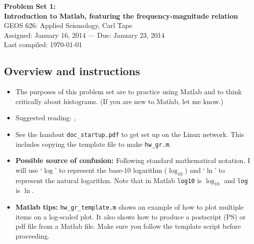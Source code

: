 \documentclass[11pt,titlepage,fleqn]{article}
\begin{document}

\begin{spacing}{1.2}
\begin{center}
{\large \bf Problem Set 1: \\
Introduction to Matlab, featuring the frequency-magnitude relation} \\
GEOS 626: Applied Seismology, Carl Tape \\
Assigned: January 16, 2014 --- Due: January 23, 2014 \\
Last compiled: \today
\end{center}
\end{spacing}


\subsection*{Overview and instructions}

\begin{itemize}

\item The purposes of this problem set are to practice using Matlab and to think critically about histograms. (If you are new to Matlab, let me know.)

\item Suggested reading: \citet[][Section 4.7.1]{SteinWysession}, \citet{GutenbergRichter1944}

\item See the handout \verb+doc_startup.pdf+ to get set up on the Linux network. This includes copying the template file to make \verb+hw_gr.m+.

\item {\bf Possible source of confusion:} Following standard mathematical notation, I will use `$\log$' to represent the base-10 logarithm ($\log_{10}$) and `$\ln$' to represent the natural logarithm. Note that in Matlab \verb+log10+ is $\log_{10}$ and \verb+log+ is $\ln$.

\item {\bf Matlab tips:}
\verb+hw_gr_template.m+ shows an example of how to plot multiple items on a log-scaled plot. It also shows how to produce a postscript (PS) or pdf file from a Matlab file. Make sure you follow the template script before proceeding.

\end{itemize}
\end{document}
